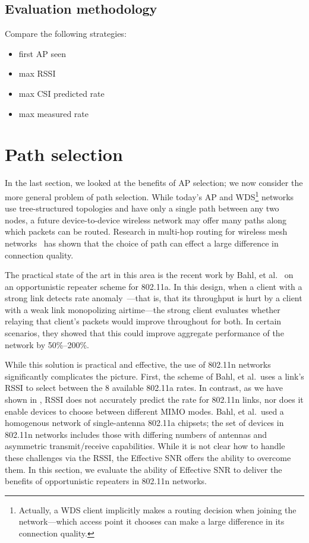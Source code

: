 \subsection{Evaluation methodology}
Compare the following strategies:
\begin{itemize}
\item first AP seen
\item max RSSI
\item max CSI predicted rate
\item max measured rate
\end{itemize}

\section{Path selection}\label{sec:esnr_pathsel}
In the last section, we looked at the benefits of AP selection; we now consider the more general problem of path selection. While today's AP and WDS\footnote{Actually, a WDS client implicitly makes a routing decision when joining the network---which access point it chooses can make a large difference in its connection quality.} networks use tree-structured topologies and have only a single path between any two nodes, a future device-to-device wireless network may offer many paths along which packets can be routed. Research in multi-hop routing for wireless mesh networks~\cite{Bahl_repeater,Rodrig_thesis} has shown that the choice of path can effect a large difference in connection quality.

The practical state of the art in this area is the recent work by Bahl, et al.~\cite{Bahl_repeater} on an opportunistic repeater scheme for 802.11a. In this design, when a client with a strong link detects rate anomaly~\cite{Heusse_RateAnomaly}---that is, that its throughput is hurt by a client with a weak link monopolizing airtime---the strong client evaluates whether relaying that client's packets would improve throughout for both. In certain scenarios, they showed that this could improve aggregate performance of the network by 50\%--200\%.

While this solution is practical and effective, the use of 802.11n networks significantly complicates the picture. First, the scheme of Bahl, et al.\ uses a link's RSSI to select between the 8 available 802.11a rates. In contrast, as we have shown in , RSSI does not accurately predict the rate for 802.11n links, nor does it enable devices to choose between different MIMO modes. Bahl, et al.\ used a homogenous network of single-antenna 802.11a chipsets; the set of devices in 802.11n networks includes those with differing numbers of antennas and asymmetric transmit/receive capabilities. While it is not clear how to handle these challenges via the RSSI, the Effective SNR offers the ability to overcome them. In this section, we evaluate the ability of Effective SNR to deliver the benefits of opportunistic repeaters in 802.11n networks.

